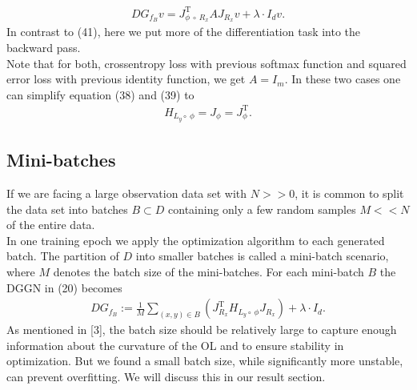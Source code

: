 \documentclass[conference]{IEEEtran}
\begin{document}
	\begin{align}
	DG_{f_{B}}v  = J_{\phi\:\circ\:R _{x}}^{\mathrm{T}}AJ_{R _{x}}v + \lambda\cdot I_{d}v.
	\end{align}
	In contrast to (41), here we put more of the differentiation task into the backward pass.\\ 
	Note that for both, crossentropy loss with previous softmax function and squared error loss with previous identity function, we get $A = I_{m}$. In these two cases one can simplify equation (38) and (39) to 
	\begin{align}
	H_{L_{y}\circ\:\phi} = J_{\phi} = J_{\phi}^{\mathrm{T}}.
	\end{align}
	
	
	
	
	\subsection{Mini-batches}
	\noindent
	If we are facing a large observation data set with $N>>0$, it is common to split the data set into batches $B\subset D$ containing only a few random samples $M<<N$ of the entire data. \\
	In one training epoch we apply the optimization algorithm to each generated batch. The partition of $D$ into smaller batches is called a mini-batch scenario, where $M$ denotes the batch size of the mini-batches. For each mini-batch $B$ the DGGN in (20) becomes
	\begin{align}
	DG_{f_{B}} := \frac{1}{M}\sum_{(x, y)\in B}^{}\left(J_{R_{x}}^{\mathrm{T}}H_{L_{y}\circ\:\phi}J_{R_{x}}\right) + \lambda\cdot I_{d}.
	\end{align}
	As mentioned in [3], the batch size should be relatively large to capture enough information about the curvature of the OL and to ensure stability in optimization. But we found a small batch size, while significantly more unstable, can prevent overfitting. We will discuss this in our result section. 
	
\end{document}
